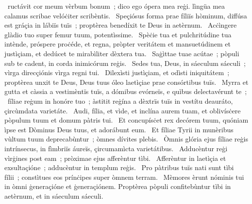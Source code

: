 { }
{%
~ructávit cor meum vèrbum bonum~; dico ego ópera mea reġi. lìngüa mea calamus scribae velóċiter scribèntis. 
~Speçiósus forma prae fíliïs hòminum, diffúsa est gráçia in lábiïs tuïs~; proptèrea benedíxit te Deus in aetèrnum. 
~Acċìngere glàdio tuo super femur tuum, potentìssime. 
~Spèċie tua et pulchritúdine tua intènde, próspere proċéde, et regna, pròpter veritátem et mansuetúdinem et justìçiam, et dedúcet te mirabìliter dèxtera tua. 
~Saġìttae tuae acútae~; pòpuli sub te cadent, in corda inimicórum reġis. 
~Sedes tua, Deus, in sáeculum sáeculi~; vìrga direcçiónis vìrga regni tui. 
~Dilexìsti justìçiam, et odìsti iniquitátem~; proptèrea unxit te Deus, Deus tuus óleo laetìçiae prae consórtibus tuïs. 
~Myrra et gutta et càssia a vestimèntïs tuïs, a dómibus evórneïs, e quìbus delectavérunt te~; 
~fíliae reġum in honóre tuo~; àstitit reġína a dèxtrïs tuïs in vestítu deauráto, çircùmdata varietáte. 
~Audi, fília, et vìde, et inclína aurem tuam, et oblivísċere pòpulum tuum et domum pàtris tui. 
~Et concupísċet rex decórem tuum, quóniam ìpse est Dòminus Deus tuus, et adorábunt eum. 
~Et fíliae Tyrii in munèribus vùltum tuum deprecabùntur~; òmnes dívites plebis. 
~Òmnis glória ejus fíliae reġis intrínsecus, in fìmbriïs áureïs, çircumamìcta varietátibus. 
~Adducèntur reġi vìrġines post eam~; pròximae ejus afferèntur tìbi. 
~Afferèntur in laetìçia et exsultaçióne~; adducèntur in templum reġis. 
~Pro pàtribus tuïs nati sunt tìbi fílii~; constìtues eos prínċipes super òmnem terram. 
~Mèmores èrunt nóminis tui in òmni ġeneraçióne et ġeneraçiónem. Proptèrea pòpuli confitebùntur tìbi in aetèrnum, et in sáeculum sáeculi. 
}
